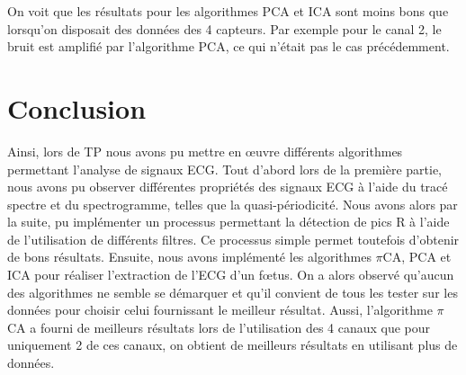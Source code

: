 \documentclass[12pt,a4paper,titlepage]{article}
\begin{document}
On voit que les résultats pour les algorithmes PCA et ICA sont moins bons que lorsqu'on
disposait des données des 4 capteurs. Par exemple pour le canal 2, le bruit est amplifié
par l'algorithme PCA, ce qui n'était pas le cas précédemment.

\section*{Conclusion}

Ainsi, lors de TP nous avons pu mettre en œuvre différents algorithmes permettant l'analyse
de signaux ECG. Tout d'abord lors de la première partie, nous avons pu observer différentes
propriétés des signaux ECG à l'aide du tracé spectre et du spectrogramme, telles que la quasi-périodicité. 
Nous avons alors par la suite, pu implémenter
un processus permettant la détection de pics R à l'aide de l'utilisation de différents
filtres. Ce processus simple permet toutefois d'obtenir de bons résultats. Ensuite, nous
avons implémenté les algorithmes $\pi$CA, PCA et ICA pour réaliser l'extraction de l'ECG d'un
fœtus. On a alors observé qu'aucun des algorithmes ne semble se démarquer et qu'il convient
de tous les tester sur les données pour choisir celui fournissant le meilleur résultat. Aussi,
l'algorithme $\pi$CA a fourni de meilleurs résultats lors de l'utilisation des 4 canaux 
que pour uniquement 2 de ces canaux, on obtient de meilleurs résultats en utilisant plus de données.
\end{document}
